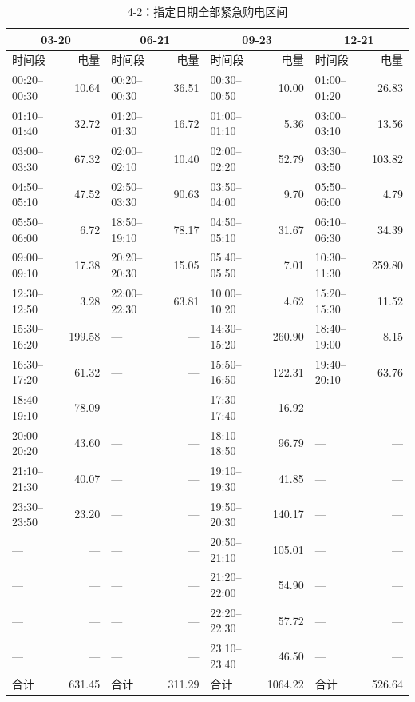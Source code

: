 \FloatBarrier
\begin{table}[htbp]\centering\scriptsize
\caption{4-2：指定日期全部紧急购电区间}
\setlength{\tabcolsep}{3pt}\begin{tabular}{lrlrlrlr}\toprule
\multicolumn{2}{c}{03-20} & \multicolumn{2}{c}{06-21} & \multicolumn{2}{c}{09-23} & \multicolumn{2}{c}{12-21}\\\midrule
时间段 & 电量 & 时间段 & 电量 & 时间段 & 电量 & 时间段 & 电量\\
00:20--00:30 & 10.64 & 00:20--00:30 & 36.51 & 00:30--00:50 & 10.00 & 01:00--01:20 & 26.83\\
01:10--01:40 & 32.72 & 01:20--01:30 & 16.72 & 01:00--01:10 & 5.36 & 03:00--03:10 & 13.56\\
03:00--03:30 & 67.32 & 02:00--02:10 & 10.40 & 02:00--02:20 & 52.79 & 03:30--03:50 & 103.82\\
04:50--05:10 & 47.52 & 02:50--03:30 & 90.63 & 03:50--04:00 & 9.70 & 05:50--06:00 & 4.79\\
05:50--06:00 & 6.72 & 18:50--19:10 & 78.17 & 04:50--05:10 & 31.67 & 06:10--06:30 & 34.39\\
09:00--09:10 & 17.38 & 20:20--20:30 & 15.05 & 05:40--05:50 & 7.01 & 10:30--11:30 & 259.80\\
12:30--12:50 & 3.28 & 22:00--22:30 & 63.81 & 10:00--10:20 & 4.62 & 15:20--15:30 & 11.52\\
15:30--16:20 & 199.58 & — & — & 14:30--15:20 & 260.90 & 18:40--19:00 & 8.15\\
16:30--17:20 & 61.32 & — & — & 15:50--16:50 & 122.31 & 19:40--20:10 & 63.76\\
18:40--19:10 & 78.09 & — & — & 17:30--17:40 & 16.92 & — & —\\
20:00--20:20 & 43.60 & — & — & 18:10--18:50 & 96.79 & — & —\\
21:10--21:30 & 40.07 & — & — & 19:10--19:30 & 41.85 & — & —\\
23:30--23:50 & 23.20 & — & — & 19:50--20:30 & 140.17 & — & —\\
— & — & — & — & 20:50--21:10 & 105.01 & — & —\\
— & — & — & — & 21:20--22:00 & 54.90 & — & —\\
— & — & — & — & 22:20--22:30 & 57.72 & — & —\\
— & — & — & — & 23:10--23:40 & 46.50 & — & —\\
合计 & 631.45 & 合计 & 311.29 & 合计 & 1064.22 & 合计 & 526.64\\
\bottomrule\end{tabular}\end{table}

